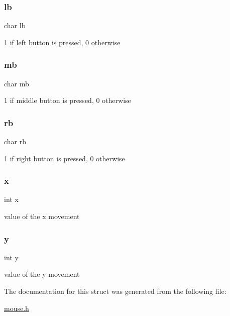 \subsubsection{\texorpdfstring{lb}{lb}}
{\footnotesize\ttfamily char lb}



1 if left button is pressed, 0 otherwise 

\hypertarget{structmouse__packet__t_a2923f784f55df16ef02f4db7ea172b33}{}\label{structmouse__packet__t_a2923f784f55df16ef02f4db7ea172b33} 
\subsubsection{\texorpdfstring{mb}{mb}}
{\footnotesize\ttfamily char mb}



1 if middle button is pressed, 0 otherwise 

\hypertarget{structmouse__packet__t_ad2b989ebf6f8d10ba3501f5c464f37e6}{}\label{structmouse__packet__t_ad2b989ebf6f8d10ba3501f5c464f37e6} 
\subsubsection{\texorpdfstring{rb}{rb}}
{\footnotesize\ttfamily char rb}



1 if right button is pressed, 0 otherwise 

\hypertarget{structmouse__packet__t_a6150e0515f7202e2fb518f7206ed97dc}{}\label{structmouse__packet__t_a6150e0515f7202e2fb518f7206ed97dc} 
\subsubsection{\texorpdfstring{x}{x}}
{\footnotesize\ttfamily int x}



value of the x movement 

\hypertarget{structmouse__packet__t_a0a2f84ed7838f07779ae24c5a9086d33}{}\label{structmouse__packet__t_a0a2f84ed7838f07779ae24c5a9086d33} 
\subsubsection{\texorpdfstring{y}{y}}
{\footnotesize\ttfamily int y}



value of the y movement 



The documentation for this struct was generated from the following file\+:\begin{DoxyCompactItemize}
\item 
\hyperlink{mouse_8h}{mouse.\+h}\end{DoxyCompactItemize}

